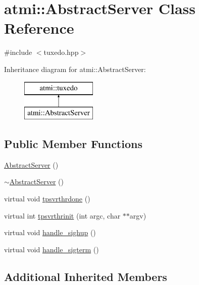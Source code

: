 \hypertarget{classatmi_1_1_abstract_server}{}\section{atmi\+:\+:Abstract\+Server Class Reference}
\label{classatmi_1_1_abstract_server}


{\ttfamily \#include $<$tuxedo.\+hpp$>$}

Inheritance diagram for atmi\+:\+:Abstract\+Server\+:\begin{figure}[H]
\begin{center}
\leavevmode
\includegraphics[height=2.000000cm]{classatmi_1_1_abstract_server}
\end{center}
\end{figure}
\subsection*{Public Member Functions}
\begin{DoxyCompactItemize}
\item 
\hyperlink{classatmi_1_1_abstract_server_a94f8a6f36001407ff5d40aff7b469ed0}{Abstract\+Server} ()
\item 
\hyperlink{classatmi_1_1_abstract_server_a0307cd9f122a533ffcb0e3636b53a2e1}{$\sim$\+Abstract\+Server} ()
\item 
virtual void \hyperlink{classatmi_1_1_abstract_server_a14f2df69f05b9dbc5f6d060b89b1059c}{tpsvrthrdone} ()
\item 
virtual int \hyperlink{classatmi_1_1_abstract_server_ad974763532b70ec01a78b316ac5fc9a2}{tpsvrthrinit} (int argc, char $\ast$$\ast$argv)
\item 
virtual void \hyperlink{classatmi_1_1_abstract_server_ae6969df1f1c97fb4c4b4d07f84a28738}{handle\+\_\+sighup} ()
\item 
virtual void \hyperlink{classatmi_1_1_abstract_server_aa7f6c20f7df624f9a911be42bb136b71}{handle\+\_\+sigterm} ()
\end{DoxyCompactItemize}
\subsection*{Additional Inherited Members}


